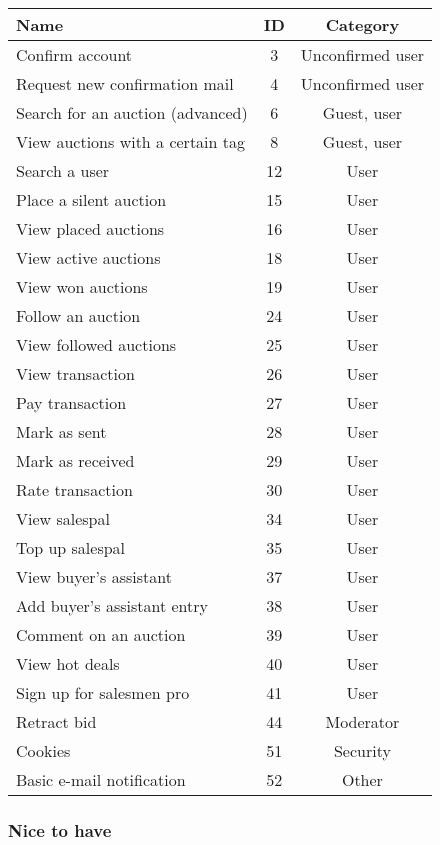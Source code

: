 	\begin{tabular}{l|c c}
	  Name & ID & Category \\ 
	  \hline
	  Confirm account & 3 & Unconfirmed user \\
	  Request new confirmation mail & 4 & Unconfirmed user \\
	  Search for an auction (advanced) & 6 & Guest, user \\
	  View auctions with a certain tag & 8 & Guest, user \\
	  Search a user & 12 & User \\
	  Place a silent auction & 15 & User \\
	  View placed auctions & 16 & User \\
	  View active auctions & 18 & User \\
	  View won auctions & 19 & User \\
	  Follow an auction & 24 & User \\
	  View followed auctions & 25 & User \\
	  View transaction & 26 & User \\
	  Pay transaction & 27 & User \\
	  Mark as sent & 28 & User \\
	  Mark as received & 29 & User \\
	  Rate transaction & 30 & User \\
	  View salespal & 34 & User \\
	  Top up salespal & 35 & User \\
	  View buyer's assistant & 37 & User \\
	  Add buyer's assistant entry & 38 & User \\
	  Comment on an auction & 39 & User \\
	  View hot deals & 40 & User \\
	  Sign up for salesmen pro & 41 & User \\
	  Retract bid & 44 & Moderator \\
	  Cookies & 51 & Security \\	  
	  Basic e-mail notification & 52 & Other \\	  
	\end{tabular} 
	
	\subsubsection{Nice to have}
	
